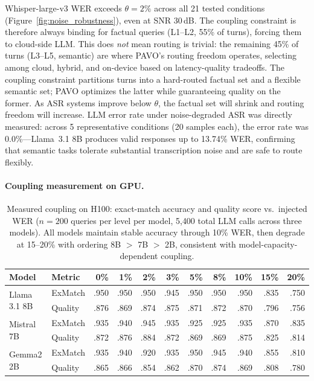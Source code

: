 \documentclass{article}
\begin{document}
Whisper-large-v3 WER exceeds $\theta=2\%$ across all 21 tested conditions (Figure~\ref{fig:noise_robustness}), even at SNR 30\,dB. The coupling constraint is therefore always binding for factual queries (L1--L2, 55\% of turns), forcing them to cloud-side LLM. This does \emph{not} mean routing is trivial: the remaining 45\% of turns (L3--L5, semantic) are where PAVO's routing freedom operates, selecting among cloud, hybrid, and on-device based on latency-quality tradeoffs. The coupling constraint partitions turns into a hard-routed factual set and a flexible semantic set; PAVO optimizes the latter while guaranteeing quality on the former. As ASR systems improve below $\theta$, the factual set will shrink and routing freedom will increase. LLM error rate under noise-degraded ASR was directly measured: across 5 representative conditions (20 samples each), the error rate was 0.0\%---Llama~3.1 8B produces valid responses up to 13.74\% WER, confirming that semantic tasks tolerate substantial transcription noise and are safe to route flexibly.

\paragraph{Coupling measurement on GPU.}

\begin{table}[t]
\centering
\caption{Measured coupling on H100: exact-match accuracy and quality score vs.\ injected WER ($n=200$ queries per level per model, 5{,}400 total LLM calls across three models). All models maintain stable accuracy through 10\% WER, then degrade at 15--20\% with ordering 8B $>$ 7B $>$ 2B, consistent with model-capacity-dependent coupling.}
\label{tab:gpu_coupling}
\small
\begin{tabular}{llrrrrrrrrr}
\toprule
Model & Metric & 0\% & 1\% & 2\% & 3\% & 5\% & 8\% & 10\% & 15\% & 20\% \\
\midrule
\multirow{2}{*}{Llama 3.1 8B}
  & ExMatch & .950 & .950 & .950 & .945 & .950 & .950 & .950 & .835 & .750 \\
  & Quality & .876 & .869 & .874 & .875 & .871 & .872 & .870 & .796 & .756 \\
\midrule
\multirow{2}{*}{Mistral 7B}
  & ExMatch & .935 & .940 & .945 & .935 & .925 & .925 & .935 & .870 & .835 \\
  & Quality & .872 & .876 & .884 & .872 & .869 & .869 & .875 & .825 & .814 \\
\midrule
\multirow{2}{*}{Gemma2 2B}
  & ExMatch & .935 & .940 & .920 & .935 & .950 & .945 & .940 & .855 & .810 \\
  & Quality & .865 & .866 & .854 & .862 & .870 & .874 & .869 & .808 & .780 \\
\bottomrule
\end{tabular}
\end{table}
\end{document}
